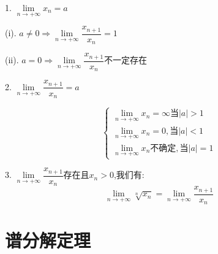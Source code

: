 \begin{theorem}[极限推论]
	1. $\lim\limits_{n\rightarrow +\infty}x_{n}=a$
	
	(i). $a\neq 0\Rightarrow \lim\limits_{n\rightarrow +\infty}\dfrac{x_{n+1}}{x_{n}}=1$
	
	(ii). $a=0\Rightarrow \lim\limits_{n\rightarrow +\infty}\dfrac{x_{n+1}}{x_{n}} \text{不一定存在}$
	
	2. $\lim\limits_{n\rightarrow +\infty}\dfrac{x_{n+1}}{x_{n}}=a$
	
	$$\left\lbrace 
	\begin{array}{l}
		\lim\limits_{n\rightarrow +\infty}x_{n}=\infty \text{当}|a|>1\\
		\lim\limits_{n\rightarrow +\infty}x_{n}=0,\text{当}|a|<1\\
		\lim\limits_{n\rightarrow +\infty}x_{n}\text{不确定},\text{当}|a|=1
	\end{array}
	\right. $$
	
	3. $\lim\limits_{n\rightarrow +\infty}\dfrac{x_{n+1}}{x_{n}}\text{存在且}x_{n}>0$,我们有:  
	$$\lim\limits_{n\rightarrow +\infty}\sqrt[n]{x_{n}}=\lim\limits_{n\rightarrow +\infty}\dfrac{x_{n+1}}{x_{n}}$$
\end{theorem}


\section{谱分解定理}

